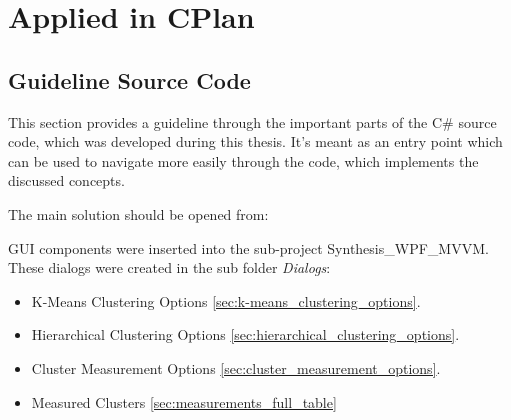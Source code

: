 \appendix
\chapter{Applied in CPlan}
\section{Guideline Source Code}
This section provides a guideline through the important parts of the C\# source code, which was developed during this thesis. It's meant as an entry point which can be used to navigate more easily through the code, which implements the discussed concepts.

The main solution should be opened from: 

\gls{GUI} components were inserted into the sub-project Synthesis\_WPF\_MVVM. These dialogs were created in the sub folder \textit{Dialogs}:

\begin{itemize}
    \item K-Means Clustering Options \ref{sec:k-means_clustering_options}.
    \item Hierarchical Clustering Options \ref{sec:hierarchical_clustering_options}.
    \item Cluster Measurement Options \ref{sec:cluster_measurement_options}.
    \item Measured Clusters \ref{sec:measurements_full_table}
\end{itemize}

